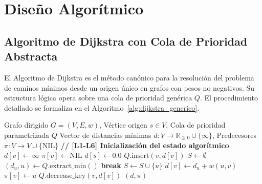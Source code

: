\section{Diseño Algorítmico}
\label{sec:diseno_algoritmico}

\subsection{Algoritmo de Dijkstra con Cola de Prioridad Abstracta}
El Algoritmo de Dijkstra es el método canónico para la resolución del problema de caminos mínimos desde un origen único en grafos con pesos no negativos. Su estructura lógica opera sobre una cola de prioridad genérica $Q$. El procedimiento detallado se formaliza en el Algoritmo~\ref{alg:dijkstra_generico}.

\begin{algorithm}[H]
\caption{Algoritmo de Dijkstra con cola de prioridad parametrizada}
\label{alg:dijkstra_generico}
\begin{algorithmic}[1]
\REQUIRE Grafo dirigido $G=(V,E,w)$, Vértice origen $s\in V$, Cola de prioridad parametrizada $Q$
\ENSURE Vector de distancias mínimas $d:V\to\mathbb{R}_{\ge0}\cup\{\infty\}$, Predecesores $\pi:V\to V\cup\{\text{NIL}\}$
\STATE \textbf{// [L1-L6] Inicialización del estado algorítmico}
    \STATE $d[v]\leftarrow\infty$
    \STATE $\pi[v]\leftarrow\text{NIL}$
\ENDFOR
\STATE $d[s]\leftarrow 0.0$
    \STATE $Q.\text{insert}(v, d[v])$ 
\ENDFOR
\STATE $S\leftarrow\emptyset$ 
    \STATE $(d_u, u)\leftarrow Q.\text{extract\_min}()$ 
        \STATE \textbf{break} 
    \ENDIF
    \STATE $S\leftarrow S\cup\{u\}$ 
            \STATE $d[v]\leftarrow d_u + w(u,v)$ 
            \STATE $\pi[v]\leftarrow u$
            \STATE $Q.\text{decrease\_key}(v, d[v])$ 
        \ENDIF
    \ENDFOR
\ENDWHILE
\RETURN $(d,\pi)$
\end{algorithmic}
\end{algorithm}

